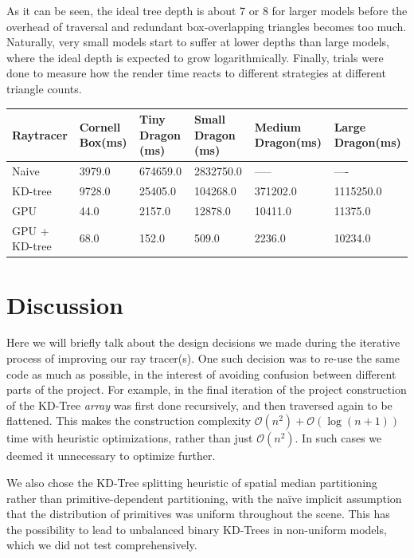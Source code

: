 \documentclass[letterpaper, 10 pt, conference]{ieeeconf}  %
\begin{document}
As it can be seen, the ideal tree depth is about 7 or 8 for larger models before the overhead of traversal and redundant box-overlapping triangles becomes too much. Naturally, very small models start to suffer at lower depths than large models, where the ideal depth is expected to grow logarithmically. Finally, trials were done to measure how the render time reacts to different strategies at different triangle counts.

\begin{table}[t]
\centering
\begin{tabular}{@{}llllll@{}}
\toprule
Raytracer     & Cornell Box(ms) & Tiny Dragon (ms) & Small Dragon (ms) & Medium Dragon(ms) & Large Dragon(ms) \\ \midrule
Naive         & 3979.0          & 674659.0         & 2832750.0         & -----         &                  ----\\
KD-tree       & 9728.0          & 25405.0          & 104268.0          & 371202.0          & 1115250.0        \\
GPU           & 44.0            & 2157.0           & 12878.0           & 10411.0           & 11375.0          \\
GPU + KD-tree & 68.0            & 152.0            & 509.0             & 2236.0            & 10234.0          \\ \bottomrule
\end{tabular}
\end{table}

\section{Discussion}
Here we will briefly talk about the design decisions we made during the iterative process of improving our ray tracer(s). One such decision was to re-use the same code as much as possible, in the interest of avoiding confusion between different parts of the project. For example, in the final iteration of the project construction of the KD-Tree \textit{array} was first done recursively, and then traversed again to be flattened. This makes the construction complexity $\mathcal{O}(n^2)+\mathcal{O}(\log{(n+1)})$ time with heuristic optimizations, rather than just $\mathcal{O}(n^2)$. In such cases we deemed it unnecessary to optimize further.

We also chose the KD-Tree splitting heuristic of spatial median partitioning rather than primitive-dependent partitioning, with the naïve implicit assumption that the distribution of primitives was uniform throughout the scene. This has the possibility to lead to unbalanced binary KD-Trees in non-uniform models, which we did not test comprehensively.
\end{document}
